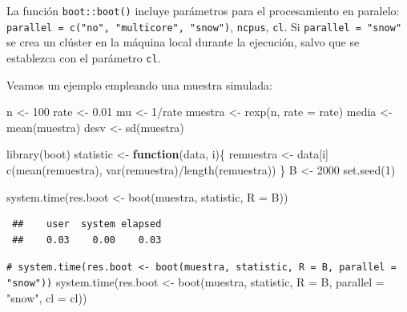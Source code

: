 \documentclass[
  10pt,
]{book}
\newenvironment{Shaded}{\begin{snugshade}}{\end{snugshade}}
\newcommand{\AttributeTok}[1]{\textcolor[rgb]{0.77,0.63,0.00}{#1}}
\newcommand{\CommentTok}[1]{\textcolor[rgb]{0.56,0.35,0.01}{\textit{#1}}}
\newcommand{\ControlFlowTok}[1]{\textcolor[rgb]{0.13,0.29,0.53}{\textbf{#1}}}
\newcommand{\DecValTok}[1]{\textcolor[rgb]{0.00,0.00,0.81}{#1}}
\newcommand{\FloatTok}[1]{\textcolor[rgb]{0.00,0.00,0.81}{#1}}
\newcommand{\FunctionTok}[1]{\textcolor[rgb]{0.00,0.00,0.00}{#1}}
\newcommand{\NormalTok}[1]{#1}
\newcommand{\OtherTok}[1]{\textcolor[rgb]{0.56,0.35,0.01}{#1}}
\newcommand{\SpecialCharTok}[1]{\textcolor[rgb]{0.00,0.00,0.00}{#1}}
\newcommand{\StringTok}[1]{\textcolor[rgb]{0.31,0.60,0.02}{#1}}
\theoremstyle{break}
\theoremstyle{nonumberplain}
\renewcommand{\CommentTok}[1]{\textcolor[rgb]{0.41,0.41,0.41}{\texttt{#1}}}
\begin{document}
La función \texttt{boot::boot()} incluye parámetros para el procesamiento en paralelo:
\texttt{parallel\ =\ c("no",\ "multicore",\ "snow")}, \texttt{ncpus}, \texttt{cl}.
Si \texttt{parallel\ =\ "snow"} se crea un clúster en la máquina local durante la ejecución, salvo que se establezca con el parámetro \texttt{cl}.

Veamos un ejemplo empleando una muestra simulada:

\begin{Shaded}
\begin{Highlighting}[]
\NormalTok{n }\OtherTok{\textless{}{-}} \DecValTok{100}
\NormalTok{rate }\OtherTok{\textless{}{-}} \FloatTok{0.01}
\NormalTok{mu }\OtherTok{\textless{}{-}} \DecValTok{1}\SpecialCharTok{/}\NormalTok{rate}
\NormalTok{muestra }\OtherTok{\textless{}{-}} \FunctionTok{rexp}\NormalTok{(n, }\AttributeTok{rate =}\NormalTok{ rate)}
\NormalTok{media }\OtherTok{\textless{}{-}} \FunctionTok{mean}\NormalTok{(muestra)}
\NormalTok{desv }\OtherTok{\textless{}{-}} \FunctionTok{sd}\NormalTok{(muestra)}

\FunctionTok{library}\NormalTok{(boot)}
\NormalTok{statistic }\OtherTok{\textless{}{-}} \ControlFlowTok{function}\NormalTok{(data, i)\{}
\NormalTok{  remuestra }\OtherTok{\textless{}{-}}\NormalTok{ data[i]}
  \FunctionTok{c}\NormalTok{(}\FunctionTok{mean}\NormalTok{(remuestra), }\FunctionTok{var}\NormalTok{(remuestra)}\SpecialCharTok{/}\FunctionTok{length}\NormalTok{(remuestra))}
\NormalTok{\}}
\NormalTok{B }\OtherTok{\textless{}{-}} \DecValTok{2000}
\FunctionTok{set.seed}\NormalTok{(}\DecValTok{1}\NormalTok{)}

\FunctionTok{system.time}\NormalTok{(res.boot }\OtherTok{\textless{}{-}} \FunctionTok{boot}\NormalTok{(muestra, statistic, }\AttributeTok{R =}\NormalTok{ B))}
\end{Highlighting}
\end{Shaded}

\begin{verbatim}
 ##    user  system elapsed 
 ##    0.03    0.00    0.03
\end{verbatim}

\begin{Shaded}
\begin{Highlighting}[]
\CommentTok{\# system.time(res.boot \textless{}{-} boot(muestra, statistic, R = B, parallel = "snow"))}
\FunctionTok{system.time}\NormalTok{(res.boot }\OtherTok{\textless{}{-}} \FunctionTok{boot}\NormalTok{(muestra, statistic, }\AttributeTok{R =}\NormalTok{ B, }\AttributeTok{parallel =} \StringTok{"snow"}\NormalTok{, }\AttributeTok{cl =}\NormalTok{ cl))}
\end{Highlighting}
\end{Shaded}
\end{document}
